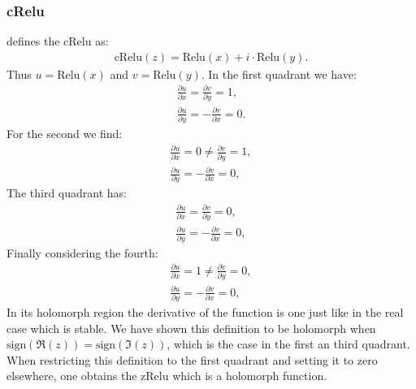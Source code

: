 \documentclass{article}
\begin{document}
\subsubsection{cRelu}
\cite{Trabelsi} defines the cRelu as:
\begin{align}
\text{cRelu}(z) = \text{Relu}(x) + i\cdot \text{Relu}(y).
\end{align}
Thus $u = \text{Relu}(x)$ and $v = \text{Relu}(y)$.
In the first quadrant we have:
\begin{align}
\frac{\partial u}{\partial x} = \frac{\partial v}{\partial y} = 1,\\
\frac{\partial u}{\partial y} = -\frac{\partial v}{\partial x} = 0.
\end{align}
For the second we find:
\begin{align}
\frac{\partial u}{\partial x} = 0 \neq \frac{\partial v}{\partial y} = 1,\\
\frac{\partial u}{\partial y} = -\frac{\partial v}{\partial x} = 0, 
\end{align}
The third quadrant has:
\begin{align}
\frac{\partial u}{\partial x} = \frac{\partial v}{\partial y} = 0,\\
\frac{\partial u}{\partial y} = -\frac{\partial v}{\partial x} = 0, 
\end{align}
Finally considering the fourth:
\begin{align}
\frac{\partial u}{\partial x} = 1 \neq \frac{\partial v}{\partial y} = 0,\\
\frac{\partial u}{\partial y} = -\frac{\partial v}{\partial x} = 0, 
\end{align}
In its holomorph region the derivative of the function is one just like in the real case which is stable.
We have shown this definition to be holomorph when $\text{sign}(\Re(z)) = \text{sign}(\Im(z))$\cite{Trabelsi}, which is the case in the first an third quadrant. When restricting this definition to the first quadrant and setting it to zero elsewhere, one obtains the $\text{zRelu}$ which is a holomorph function. \\
\end{document}
